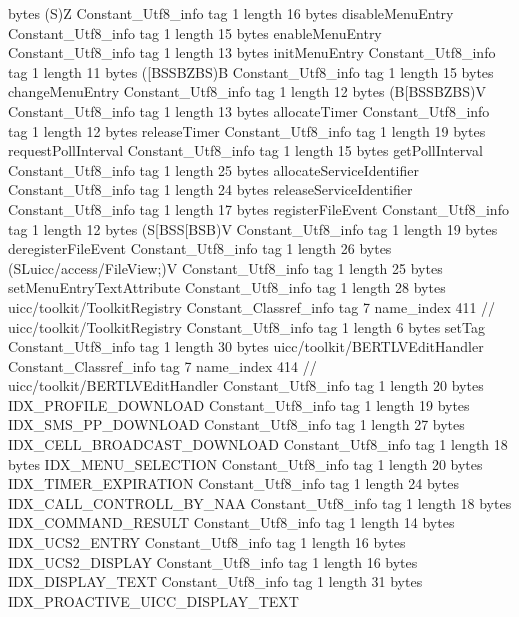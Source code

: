 {{{			bytes	(S)Z
		}
		Constant_Utf8_info {
			tag	1
			length	16
			bytes	disableMenuEntry
		}
		Constant_Utf8_info {
			tag	1
			length	15
			bytes	enableMenuEntry
		}
		Constant_Utf8_info {
			tag	1
			length	13
			bytes	initMenuEntry
		}
		Constant_Utf8_info {
			tag	1
			length	11
			bytes	([BSSBZBS)B
		}
		Constant_Utf8_info {
			tag	1
			length	15
			bytes	changeMenuEntry
		}
		Constant_Utf8_info {
			tag	1
			length	12
			bytes	(B[BSSBZBS)V
		}
		Constant_Utf8_info {
			tag	1
			length	13
			bytes	allocateTimer
		}
		Constant_Utf8_info {
			tag	1
			length	12
			bytes	releaseTimer
		}
		Constant_Utf8_info {
			tag	1
			length	19
			bytes	requestPollInterval
		}
		Constant_Utf8_info {
			tag	1
			length	15
			bytes	getPollInterval
		}
		Constant_Utf8_info {
			tag	1
			length	25
			bytes	allocateServiceIdentifier
		}
		Constant_Utf8_info {
			tag	1
			length	24
			bytes	releaseServiceIdentifier
		}
		Constant_Utf8_info {
			tag	1
			length	17
			bytes	registerFileEvent
		}
		Constant_Utf8_info {
			tag	1
			length	12
			bytes	(S[BSS[BSB)V
		}
		Constant_Utf8_info {
			tag	1
			length	19
			bytes	deregisterFileEvent
		}
		Constant_Utf8_info {
			tag	1
			length	26
			bytes	(SLuicc/access/FileView;)V
		}
		Constant_Utf8_info {
			tag	1
			length	25
			bytes	setMenuEntryTextAttribute
		}
		Constant_Utf8_info {
			tag	1
			length	28
			bytes	uicc/toolkit/ToolkitRegistry
		}
		Constant_Classref_info {
			tag	7
			name_index	411		// uicc/toolkit/ToolkitRegistry
		}
		Constant_Utf8_info {
			tag	1
			length	6
			bytes	setTag
		}
		Constant_Utf8_info {
			tag	1
			length	30
			bytes	uicc/toolkit/BERTLVEditHandler
		}
		Constant_Classref_info {
			tag	7
			name_index	414		// uicc/toolkit/BERTLVEditHandler
		}
		Constant_Utf8_info {
			tag	1
			length	20
			bytes	IDX_PROFILE_DOWNLOAD
		}
		Constant_Utf8_info {
			tag	1
			length	19
			bytes	IDX_SMS_PP_DOWNLOAD
		}
		Constant_Utf8_info {
			tag	1
			length	27
			bytes	IDX_CELL_BROADCAST_DOWNLOAD
		}
		Constant_Utf8_info {
			tag	1
			length	18
			bytes	IDX_MENU_SELECTION
		}
		Constant_Utf8_info {
			tag	1
			length	20
			bytes	IDX_TIMER_EXPIRATION
		}
		Constant_Utf8_info {
			tag	1
			length	24
			bytes	IDX_CALL_CONTROLL_BY_NAA
		}
		Constant_Utf8_info {
			tag	1
			length	18
			bytes	IDX_COMMAND_RESULT
		}
		Constant_Utf8_info {
			tag	1
			length	14
			bytes	IDX_UCS2_ENTRY
		}
		Constant_Utf8_info {
			tag	1
			length	16
			bytes	IDX_UCS2_DISPLAY
		}
		Constant_Utf8_info {
			tag	1
			length	16
			bytes	IDX_DISPLAY_TEXT
		}
		Constant_Utf8_info {
			tag	1
			length	31
			bytes	IDX_PROACTIVE_UICC_DISPLAY_TEXT
}}}
